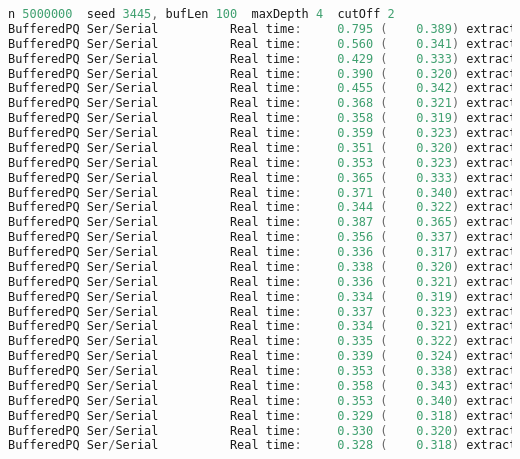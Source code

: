 \documentclass[format=acmsmall, review=false, screen=true]{acmart}
\begin{document}
\begin{lstlisting}[language=java]
n 5000000  seed 3445, bufLen 100  maxDepth 4  cutOff 2
BufferedPQ Ser/Serial          Real time:     0.795 (    0.389) extract: 5000000
BufferedPQ Ser/Serial          Real time:     0.560 (    0.341) extract: 2500000
BufferedPQ Ser/Serial          Real time:     0.429 (    0.333) extract: 1666666
BufferedPQ Ser/Serial          Real time:     0.390 (    0.320) extract: 1250000
BufferedPQ Ser/Serial          Real time:     0.455 (    0.342) extract: 1000000
BufferedPQ Ser/Serial          Real time:     0.368 (    0.321) extract: 833333
BufferedPQ Ser/Serial          Real time:     0.358 (    0.319) extract: 714285
BufferedPQ Ser/Serial          Real time:     0.359 (    0.323) extract: 625000
BufferedPQ Ser/Serial          Real time:     0.351 (    0.320) extract: 555555
BufferedPQ Ser/Serial          Real time:     0.353 (    0.323) extract: 500000
BufferedPQ Ser/Serial          Real time:     0.365 (    0.333) extract: 454545
BufferedPQ Ser/Serial          Real time:     0.371 (    0.340) extract: 416666
BufferedPQ Ser/Serial          Real time:     0.344 (    0.322) extract: 384615
BufferedPQ Ser/Serial          Real time:     0.387 (    0.365) extract: 357142
BufferedPQ Ser/Serial          Real time:     0.356 (    0.337) extract: 333333
BufferedPQ Ser/Serial          Real time:     0.336 (    0.317) extract: 312500
BufferedPQ Ser/Serial          Real time:     0.338 (    0.320) extract: 294117
BufferedPQ Ser/Serial          Real time:     0.336 (    0.321) extract: 277777
BufferedPQ Ser/Serial          Real time:     0.334 (    0.319) extract: 263157
BufferedPQ Ser/Serial          Real time:     0.337 (    0.323) extract: 250000
BufferedPQ Ser/Serial          Real time:     0.334 (    0.321) extract: 238095
BufferedPQ Ser/Serial          Real time:     0.335 (    0.322) extract: 227272
BufferedPQ Ser/Serial          Real time:     0.339 (    0.324) extract: 217391
BufferedPQ Ser/Serial          Real time:     0.353 (    0.338) extract: 208333
BufferedPQ Ser/Serial          Real time:     0.358 (    0.343) extract: 200000
BufferedPQ Ser/Serial          Real time:     0.353 (    0.340) extract: 192307
BufferedPQ Ser/Serial          Real time:     0.329 (    0.318) extract: 185185
BufferedPQ Ser/Serial          Real time:     0.330 (    0.320) extract: 178571
BufferedPQ Ser/Serial          Real time:     0.328 (    0.318) extract: 172413
\end{lstlisting}
\end{document}
